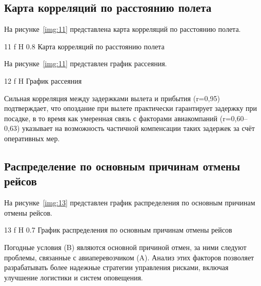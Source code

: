 \subsection{Карта корреляций по расстоянию полета}

На рисунке~\ref{img:11} представлена карта корреляций по расстоянию полета.

{11}
{f}
{H}
{0.8\textwidth}
{Карта корреляций по расстоянию полета}

На рисунке~\ref{img:11} представлен график рассеяния.

{12}
{f}
{H}
{\textwidth}
{График рассеяния}

Сильная корреляция между задержками вылета и прибытия (r=0,95) подтверждает, что опоздание при вылете практически гарантирует задержку при посадке, в то время как умеренная связь с факторами авиакомпаний (r=0,60–0,63) указывает на возможность частичной компенсации таких задержек за счёт оперативных мер.


\subsection{Распределение по основным причинам отмены рейсов}

На рисунке~\ref{img:13} представлен график распределения по основным причинам отмены рейсов.

{13}
{f}
{H}
{0.7\textwidth}
{График распределения по основным причинам отмены рейсов}

Погодные условия (B) являются основной причиной отмен, за ними следуют проблемы, связанные с авиаперевозчиком (A).
Анализ этих факторов позволяет разрабатывать более надежные стратегии управления рисками, включая улучшение логистики и систем оповещения.


